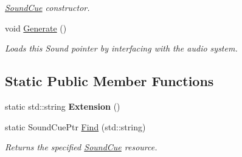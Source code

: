 \begin{DoxyCompactItemize}
\begin{DoxyCompactList}\small\item\em \hyperlink{classDCEngine_1_1SoundCue}{Sound\-Cue} constructor. \end{DoxyCompactList}\item 
\hypertarget{classDCEngine_1_1SoundCue_abb049f82fa2457c82a9d63d5be30f23a}{void \hyperlink{classDCEngine_1_1SoundCue_abb049f82fa2457c82a9d63d5be30f23a}{Generate} ()}\label{classDCEngine_1_1SoundCue_abb049f82fa2457c82a9d63d5be30f23a}

\begin{DoxyCompactList}\small\item\em Loads this Sound pointer by interfacing with the audio system. \end{DoxyCompactList}\end{DoxyCompactItemize}
\subsection*{Static Public Member Functions}
\begin{DoxyCompactItemize}
\item 
\hypertarget{classDCEngine_1_1SoundCue_a57c92c8d1118946240165d2b5d53a57b}{static std\-::string {\bfseries Extension} ()}\label{classDCEngine_1_1SoundCue_a57c92c8d1118946240165d2b5d53a57b}

\item 
static Sound\-Cue\-Ptr \hyperlink{classDCEngine_1_1SoundCue_a023a76d96d9a6a383fa12d5e3d0e97f5}{Find} (std\-::string)
\begin{DoxyCompactList}\small\item\em Returns the specified \hyperlink{classDCEngine_1_1SoundCue}{Sound\-Cue} resource. \end{DoxyCompactList}\end{DoxyCompactItemize}
